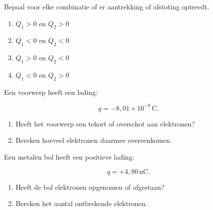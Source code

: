 \documentclass{ximera}
\begin{document}






\begin{oefening}{\oefB}

Bepaal voor elke combinatie of er aantrekking of afstoting optreedt.

\begin{enumerate}
  \item $Q_1>0$ en $Q_2>0$
  \item $Q_1<0$ en $Q_2<0$
  \item $Q_1>0$ en $Q_2<0$
  \item $Q_1<0$ en $Q_2>0$
\end{enumerate}

\end{oefening}


\begin{oefening}[Elektronenoverschot]{\oefB\ESS}

Een voorwerp heeft een lading:

\[
q=-8{,}01\times10^{-9}\,\mathrm C.
\]

\begin{enumerate}
  \item Heeft het voorwerp een tekort of overschot aan elektronen?
  \item Bereken hoeveel elektronen daarmee overeenkomen.
\end{enumerate}

\end{oefening}


\begin{oefening}[Elektronentekort]{\oefB\ESS}

Een metalen bol heeft een positieve lading:

\[
q=+4{,}80\,\mathrm{nC}.
\]

\begin{enumerate}
  \item Heeft de bol elektronen opgenomen of afgestaan?
  \item Bereken het aantal ontbrekende elektronen.
\end{enumerate}

\end{oefening}
\end{document}
